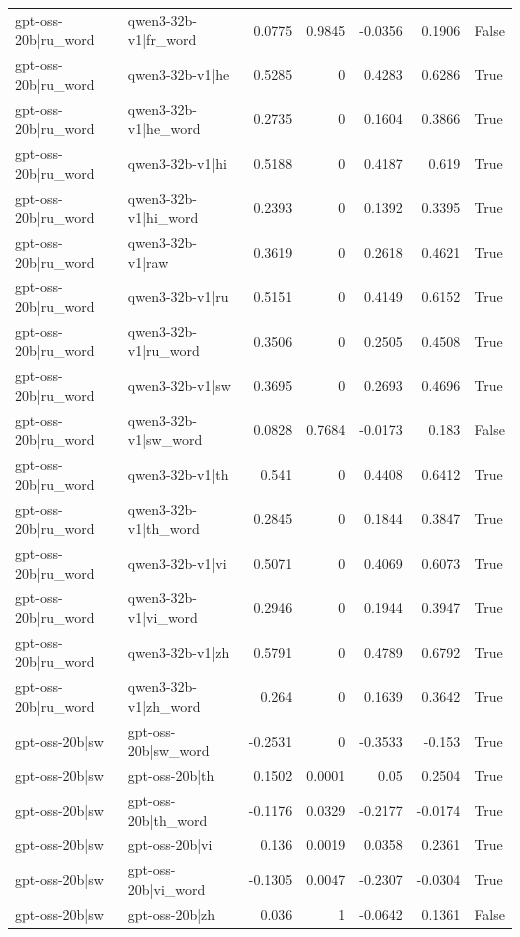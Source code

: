 \begin{table}
\begin{tabular}{l l r r r r l}
gpt-oss-20b|ru_word & qwen3-32b-v1|fr_word & 0.0775 & 0.9845 & -0.0356 & 0.1906 & False \\
gpt-oss-20b|ru_word & qwen3-32b-v1|he & 0.5285 & 0 & 0.4283 & 0.6286 & True \\
gpt-oss-20b|ru_word & qwen3-32b-v1|he_word & 0.2735 & 0 & 0.1604 & 0.3866 & True \\
gpt-oss-20b|ru_word & qwen3-32b-v1|hi & 0.5188 & 0 & 0.4187 & 0.619 & True \\
gpt-oss-20b|ru_word & qwen3-32b-v1|hi_word & 0.2393 & 0 & 0.1392 & 0.3395 & True \\
gpt-oss-20b|ru_word & qwen3-32b-v1|raw & 0.3619 & 0 & 0.2618 & 0.4621 & True \\
gpt-oss-20b|ru_word & qwen3-32b-v1|ru & 0.5151 & 0 & 0.4149 & 0.6152 & True \\
gpt-oss-20b|ru_word & qwen3-32b-v1|ru_word & 0.3506 & 0 & 0.2505 & 0.4508 & True \\
gpt-oss-20b|ru_word & qwen3-32b-v1|sw & 0.3695 & 0 & 0.2693 & 0.4696 & True \\
gpt-oss-20b|ru_word & qwen3-32b-v1|sw_word & 0.0828 & 0.7684 & -0.0173 & 0.183 & False \\
gpt-oss-20b|ru_word & qwen3-32b-v1|th & 0.541 & 0 & 0.4408 & 0.6412 & True \\
gpt-oss-20b|ru_word & qwen3-32b-v1|th_word & 0.2845 & 0 & 0.1844 & 0.3847 & True \\
gpt-oss-20b|ru_word & qwen3-32b-v1|vi & 0.5071 & 0 & 0.4069 & 0.6073 & True \\
gpt-oss-20b|ru_word & qwen3-32b-v1|vi_word & 0.2946 & 0 & 0.1944 & 0.3947 & True \\
gpt-oss-20b|ru_word & qwen3-32b-v1|zh & 0.5791 & 0 & 0.4789 & 0.6792 & True \\
gpt-oss-20b|ru_word & qwen3-32b-v1|zh_word & 0.264 & 0 & 0.1639 & 0.3642 & True \\
gpt-oss-20b|sw & gpt-oss-20b|sw_word & -0.2531 & 0 & -0.3533 & -0.153 & True \\
gpt-oss-20b|sw & gpt-oss-20b|th & 0.1502 & 0.0001 & 0.05 & 0.2504 & True \\
gpt-oss-20b|sw & gpt-oss-20b|th_word & -0.1176 & 0.0329 & -0.2177 & -0.0174 & True \\
gpt-oss-20b|sw & gpt-oss-20b|vi & 0.136 & 0.0019 & 0.0358 & 0.2361 & True \\
gpt-oss-20b|sw & gpt-oss-20b|vi_word & -0.1305 & 0.0047 & -0.2307 & -0.0304 & True \\
gpt-oss-20b|sw & gpt-oss-20b|zh & 0.036 & 1 & -0.0642 & 0.1361 & False \\

\end{tabular}
\end{table}
